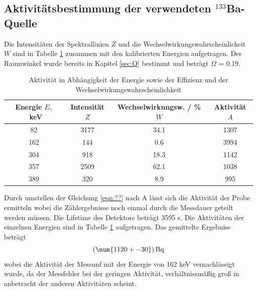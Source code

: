 \subsection{Aktivitätsbestimmung der verwendeten $^{133}$Ba-Quelle}
Die Intensitäten der Spektrallinien $Z$ und die Wechselwirkungswahrscheinlickeit $W$ sind in Tabelle \ref{tab:Ba} zusammen mit den kalibrierten Energien aufgetragen. Der Raumwinkel wurde bereits in Kapitel \ref{sec:Q} bestimmt und beträgt $\Omega$ = 0.19.
\begin{table}
  \centering
  \caption{Aktivität in Abhängigkeit der Energie sowie der Effizienz und der Wechselwirkungswahrscheinlichkeit}
  \begin{tabular}{c c c c}
    \toprule
	Energie $E_\gamma$ \ keV & Intensität $Z$ & Wechselwirkungsw. / \% $W$ & Aktivität $A$ \\
    \hline
	82	& 3177	& 34.1	& 1307	\\
	162	& 144	& 0.6	& 3994	\\
	304	& 918	& 18.3	& 1142	\\
	357	& 2509	& 62.1	& 1038	\\
	389	& 320	& 8.9	& 995	\\
    \bottomrule
  \end{tabular}
  \label{tab:Ba}
\end{table}
Durch umstellen der Gleichung \ref{eqn:??} nach A lässt sich die Aktivität der Probe ermitteln wobei die Zählergebnisse noch einmal durch die Messdauer geteilt werden müssen. Die Lifetime des Detektors beträgt 3595 s. Die Aktivitäten der einzelnen Energien sind in Tabelle \ref{tab:Ba} aufgetragen. Das gemittelte Ergebniss beträgt
\begin{equation}
  (\num{1120 +- 30}) \, \text{Bq}
  \label{eqn:aktBq}
\end{equation}
wobei die Aktivität der Messunf mit der Energie von 162 keV vernachlässigt wurde, da der Messfehler bei der geringen Aktivität, verhältnissmäßig groß in anbetracht der anderen Aktivitäten scheint.
